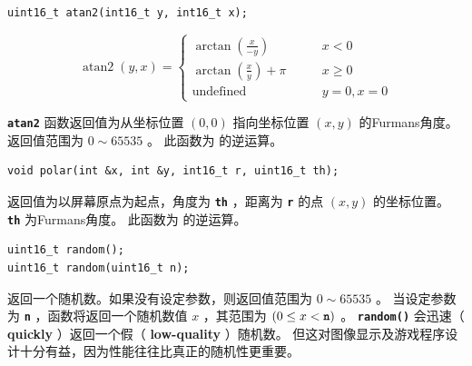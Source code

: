 \documentclass[10pt]{book}
\newcommand{\mach}[1]{\texttt{\textbf{#1}}}
\begin{document}
\begin{CJK}{UTF8}{gkai}
\begin{framed}
\begin{verbatim}
uint16_t atan2(int16_t y, int16_t x);
\end{verbatim}
\end{framed}

\[
\operatorname{atan2}(y, x) = \begin{cases}
\arctan\left(\frac x {-y} \right) & \qquad x < 0 \\
\arctan\left(\frac x y \right) + \pi& \qquad x \ge 0 \\
\text{undefined} & \qquad y = 0, x = 0
\end{cases}
\]

\mach{atan2} 函数返回值为从坐标位置 $(0,0)$ 指向坐标位置 $(x, y)$ 的Furmans角度。
返回值范围为 $0\sim65535$ 。
此函数为  的逆运算。
\newpage


\begin{framed}
\begin{verbatim}
void polar(int &x, int &y, int16_t r, uint16_t th);
\end{verbatim}
\end{framed}

\begin{center}
\end{center}

返回值为以屏幕原点为起点，角度为 \mach{th} ，距离为 \mach{r} 的点 $(x,y)$ 的坐标位置。
\mach{th} 为Furmans角度。
此函数为  的逆运算。


\begin{framed}
\begin{verbatim}
uint16_t random();
uint16_t random(uint16_t n);
\end{verbatim}
\end{framed}

返回一个随机数。如果没有设定参数，则返回值范围为 $0\sim65535$ 。
当设定参数为 \mach{n} ，函数将返回一个随机数值 $x$ ，其范围为 $(0 \le x < \mach{n})$ 。
\mach{random()} 会迅速（ \textbf{quickly} ）返回一个假（ \textbf{low-quality} ）随机数。
但这对图像显示及游戏程序设计十分有益，因为性能往往比真正的随机性更重要。


\end{CJK}
\end{document}
